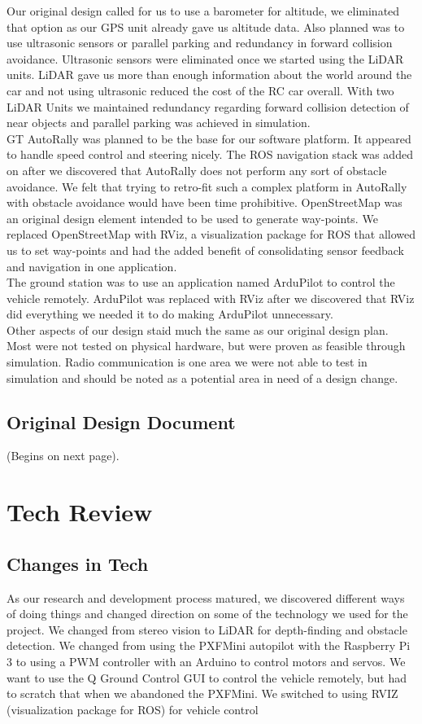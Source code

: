 \documentclass[compsoc,draftclsnofoot,onecolumn,10pt]{IEEEtran}
\begin{document}
Our original design called for us to use a barometer for altitude, we eliminated that option as our GPS unit already gave us altitude data. Also planned was to use ultrasonic sensors or parallel parking and redundancy in forward collision avoidance. Ultrasonic sensors were eliminated once we started using the LiDAR units. LiDAR gave us more than enough information about the world around the car and not using ultrasonic reduced the cost of the RC car overall. With two LiDAR Units we maintained redundancy regarding forward collision detection of near objects and parallel parking was achieved in simulation.\\
GT AutoRally was planned to be the base for our software platform. It appeared to handle speed control and steering nicely. The ROS navigation stack was added on after we discovered that AutoRally does not perform any sort of obstacle avoidance. We felt that trying to retro-fit such a complex platform in AutoRally with obstacle avoidance would have been time prohibitive. OpenStreetMap was an original design element intended to be used to generate way-points. We replaced OpenStreetMap with RViz, a visualization package for ROS that allowed us to set way-points and had the added benefit of consolidating sensor feedback and navigation in one application.\\
The ground station was to use an application named ArduPilot to control the vehicle remotely. ArduPilot was replaced with RViz after we discovered that RViz did everything we needed it to do making ArduPilot unnecessary.\\
Other aspects of our design staid much the same as our original design plan. Most were not tested on physical hardware, but were proven as feasible through simulation. Radio communication is one area we were not able to test in simulation and should be noted as a potential area in need of a design change.


\subsection{Original Design Document}
(Begins on next page).




\clearpage
\section{Tech Review}
\subsection{Changes in Tech}
As our research and development process matured, we discovered different ways of doing things and changed direction on some of the technology we used for the project.
We changed from stereo vision to LiDAR for depth-finding and obstacle detection.
We changed from using the PXFMini autopilot with the Raspberry Pi 3 to using a PWM controller with an Arduino to control motors and servos.
We want to use the Q Ground Control GUI to control the vehicle remotely, but had to scratch that when we abandoned the PXFMini.
We switched to using RVIZ (visualization package for ROS) for vehicle control
\end{document}
